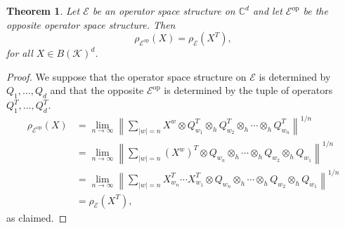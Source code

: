 \documentclass[12pt]{amsart}
\numberwithin{equation}{section}
\newtheorem{theorem}{Theorem}[section]
\theoremstyle{definition}
\newcommand{\cE}{\mathcal{E}}
\newcommand{\cK}{\mathcal{K}}
\newcommand{\bC}{\mathbb{C}}
\DeclareMathOperator{\op}{op}
\begin{document}
\begin{theorem}\label{thm:op}
    Let $\cE$ be an operator space structure on $\bC^d$ and let $\cE^{\op}$ be the opposite operator space structure. 
    Then 
    \[
    \rho_{\cE^{\op}}(X) = \rho_{\cE}(X^T), 
    \]
    for all $X \in B(\cK)^d$.
\end{theorem}
\begin{proof}
We suppose that the operator space structure on $\cE$ is determined by $Q_1, \ldots, Q_d$ and that the opposite $\cE^{\op}$ is determined by the tuple of operators $Q_1^T, \ldots, Q_d^T$.
\begin{align*}
\rho_{\cE^{\op}}(X) &= \lim_{n \to \infty} \left \|\sum_{|w|=n} X^w \otimes Q^T_{w_1} \otimes_h Q^T_{w_2} \otimes_h \cdots \otimes_h Q^T_{w_n} \right\|^{1/n} \\
&= \lim_{n \to \infty} \left \|\sum_{|w|=n} (X^w)^T \otimes Q_{w_n} \otimes_h \cdots \otimes_h  Q_{w_2} \otimes_h Q_{w_1} \right\|^{1/n} \\
&= \lim_{n \to \infty} \left \|\sum_{|w|=n} X_{w_n}^T \cdots X_{w_1}^T \otimes Q_{w_n} \otimes_h \cdots \otimes_h  Q_{w_2} \otimes_h Q_{w_1} \right\|^{1/n} \\
&= \rho_\cE(X^T), 
\end{align*}
as claimed. 
\end{proof}
\end{document}
